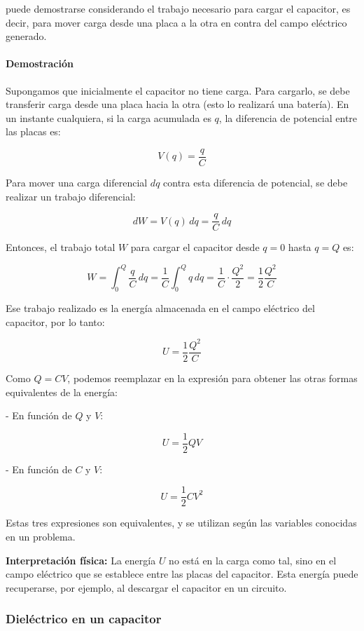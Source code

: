 puede demostrarse considerando el trabajo necesario para cargar el capacitor, es decir, para mover carga desde una placa a la otra en contra del campo eléctrico generado.

\paragraph{Demostración}

Supongamos que inicialmente el capacitor no tiene carga. Para cargarlo, se debe transferir carga desde una placa hacia la otra (esto lo realizará una batería). En un instante cualquiera, si la carga acumulada es \( q \), la diferencia de potencial entre las placas es:

\[
V(q) = \frac{q}{C}
\]

Para mover una carga diferencial \( dq \) contra esta diferencia de potencial, se debe realizar un trabajo diferencial:

\[
dW = V(q) \, dq = \frac{q}{C} \, dq
\]


Entonces, el trabajo total \( W \) para cargar el capacitor desde \( q = 0 \) hasta \( q = Q \) es:

\[
W = \int_{0}^{Q} \frac{q}{C} \, dq = \frac{1}{C} \int_{0}^{Q} q \, dq = \frac{1}{C} \cdot \frac{Q^2}{2} = \frac{1}{2} \frac{Q^2}{C}
\]

Ese trabajo realizado es la energía almacenada en el campo eléctrico del capacitor, por lo tanto:

\[
U = \frac{1}{2} \frac{Q^2}{C}
\]

Como \( Q = CV \), podemos reemplazar en la expresión para obtener las otras formas equivalentes de la energía:

- En función de \( Q \) y \( V \):

\[
U = \frac{1}{2} QV
\]

- En función de \( C \) y \( V \):

\[
U = \frac{1}{2} CV^2
\]

Estas tres expresiones son equivalentes, y se utilizan según las variables conocidas en un problema.

\textbf{Interpretación física:} La energía \( U \) no está en la carga como tal, sino en el campo eléctrico que se establece entre las placas del capacitor. Esta energía puede recuperarse, por ejemplo, al descargar el capacitor en un circuito.

\subsubsection{Dieléctrico en un capacitor}

